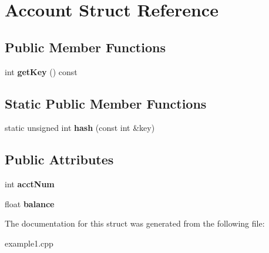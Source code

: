 \hypertarget{struct_account}{\section{Account Struct Reference}
\label{struct_account}
}
\subsection*{Public Member Functions}
\begin{DoxyCompactItemize}
\item 
\hypertarget{struct_account_a799fdb1580f800ef7fba220c0dfa9ed9}{int {\bfseries get\+Key} () const }\label{struct_account_a799fdb1580f800ef7fba220c0dfa9ed9}

\end{DoxyCompactItemize}
\subsection*{Static Public Member Functions}
\begin{DoxyCompactItemize}
\item 
\hypertarget{struct_account_a05ec48bb7b69a8e39a2f66077fb5f0e5}{static unsigned int {\bfseries hash} (const int \&key)}\label{struct_account_a05ec48bb7b69a8e39a2f66077fb5f0e5}

\end{DoxyCompactItemize}
\subsection*{Public Attributes}
\begin{DoxyCompactItemize}
\item 
\hypertarget{struct_account_a28c251b009a021f846b5c1a612142c3a}{int {\bfseries acct\+Num}}\label{struct_account_a28c251b009a021f846b5c1a612142c3a}

\item 
\hypertarget{struct_account_a3acb87e14fe08776a714037637f248f7}{float {\bfseries balance}}\label{struct_account_a3acb87e14fe08776a714037637f248f7}

\end{DoxyCompactItemize}


The documentation for this struct was generated from the following file\+:\begin{DoxyCompactItemize}
\item 
example1.\+cpp\end{DoxyCompactItemize}
